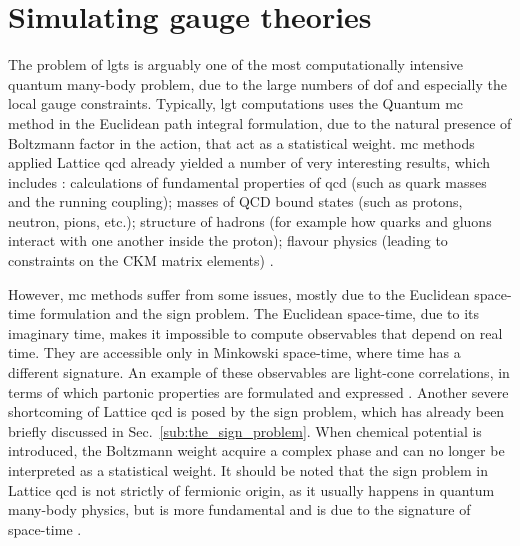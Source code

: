 \section{Simulating gauge theories}
\label{sec:simulating_gauge_theories}


The problem of \ac{lgt}s is arguably one of the most computationally intensive quantum many-body problem, due to the large numbers of \ac{dof} and especially the local gauge constraints.
Typically, \ac{lgt} computations uses the Quantum \ac{mc} method in the Euclidean path integral formulation, due to the natural presence of Boltzmann factor in the action, that act as a statistical weight.
\Ac{mc} methods applied Lattice \ac{qcd} already yielded a number of very interesting results, which includes \cite{lin2018qcd}:
calculations of fundamental properties of \ac{qcd} (such as quark masses and the running coupling); masses of QCD bound states (such as protons, neutron, pions, etc.); structure of hadrons (for example how quarks and gluons interact with one another inside the proton); flavour physics (leading to constraints on the CKM matrix elements) \cite{banuls2020lgtreview}.

However, \ac{mc} methods suffer from some issues, mostly due to the Euclidean space-time formulation and the sign problem.
The Euclidean space-time, due to its imaginary time, makes it impossible to compute observables that depend on real time.
They are accessible only in Minkowski space-time, where time has a different signature.
An example of these observables are light-cone correlations, in terms of which partonic properties are formulated and expressed \cite{cichy2019lightcone}.
Another severe shortcoming of Lattice \ac{qcd} is posed by the sign problem, which has already been briefly discussed in Sec.~\ref{sub:the_sign_problem}.
When chemical potential is introduced, the Boltzmann weight acquire a complex phase and can no longer be interpreted as a statistical weight.
It should be noted that the sign problem in Lattice \ac{qcd} is not strictly of fermionic origin, as it usually happens in quantum many-body physics, but is more fundamental and is due to the signature of space-time \cite{banuls2020lgtreview}.

